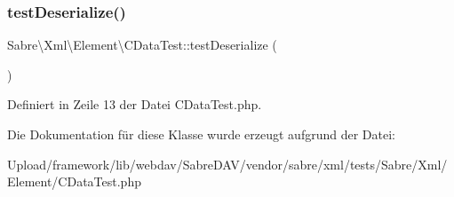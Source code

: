 \subsubsection{\texorpdfstring{test\+Deserialize()}{testDeserialize()}}
{\footnotesize\ttfamily Sabre\textbackslash{}\+Xml\textbackslash{}\+Element\textbackslash{}\+C\+Data\+Test\+::test\+Deserialize (\begin{DoxyParamCaption}{ }\end{DoxyParamCaption})}



Definiert in Zeile 13 der Datei C\+Data\+Test.\+php.



Die Dokumentation für diese Klasse wurde erzeugt aufgrund der Datei\+:\begin{DoxyCompactItemize}
\item 
Upload/framework/lib/webdav/\+Sabre\+D\+A\+V/vendor/sabre/xml/tests/\+Sabre/\+Xml/\+Element/C\+Data\+Test.\+php\end{DoxyCompactItemize}
